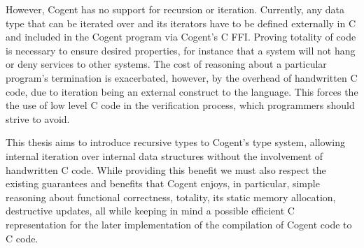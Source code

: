 However, Cogent has no support for recursion or iteration.
Currently, any data type that can be iterated over and its iterators have to be defined externally in C
  and included in the Cogent program via Cogent's C FFI.
Proving totality of code is necessary to ensure desired properties, for instance that a system will not hang
  or deny services to other systems.
The cost of reasoning about a particular program's termination is exacerbated, however, by the overhead of
 handwritten C code, due to iteration being an external construct to the language.
This forces the the use of low level C code in the verification process, which programmers should strive to avoid.

This thesis aims to introduce recursive types to Cogent's type system, allowing internal iteration over
  internal data structures without the involvement of handwritten C code.
While providing this benefit we must also respect the existing guarantees and benefits that Cogent enjoys,
  in particular, simple reasoning about functional correctness, totality,
  its static memory allocation, destructive updates, all while keeping in mind
  a possible efficient C representation for the later implementation of the compilation of Cogent
  code to C code.
